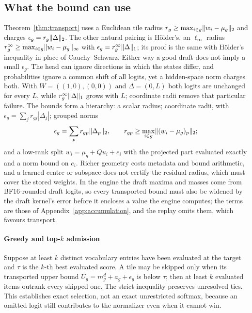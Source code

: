 \subsection{What the bound can use}\label{app:transport-geometry}
Theorem~\ref{thm:transport} uses a Euclidean tile radius $r_g\ge\max_{i\in g}\lVert w_i-\mu_g\rVert_2$ and charges $\epsilon_g=r_g\lVert \Delta\rVert_2$. The other natural pairing is Hölder's, an $\ell_\infty$ radius $r^\infty_g\ge\max_{i\in g}\lVert w_i-\mu_g\rVert_\infty$ with $\epsilon_g=r^\infty_g\lVert \Delta\rVert_1$; its proof is the same with Hölder's inequality in place of Cauchy--Schwarz. Either way a good draft does not imply a small $\epsilon_g$. The head can ignore directions in which the states differ, and probabilities ignore a common shift of all logits, yet a hidden-space norm charges both. With $W=((1,0),(0,0))$ and $\Delta=(0,L)$ both logits are unchanged for every $L$, while $r^\infty_g\lVert \Delta\rVert_1$ grows with $L$; coordinate radii remove that particular failure. The bounds form a hierarchy: a scalar radius; coordinate radii, with $\epsilon_g=\sum_jr_{gj}|\Delta_j|$; grouped norms
\begin{equation}
\epsilon_g=\sum_pr_{gp}\lVert \Delta_p\rVert_2,\qquad r_{gp}\ge\max_{i\in g}\lVert (w_i-\mu_g)_p\rVert_2;\label{eq:groupbound}
\end{equation}
and a low-rank split $w_i=\mu_g+Qu_i+e_i$ with the projected part evaluated exactly and a norm bound on $e_i$. Richer geometry costs metadata and bound arithmetic, and a learned centre or subspace does not certify the residual radius, which must cover the stored weights. In the engine the draft maxima and masses come from BF16-rounded draft logits, so every transported bound must also be widened by the draft kernel's error before it encloses a value the engine computes; the terms are those of Appendix~\ref{app:accumulation}, and the replay omits them, which favours transport.

\paragraph{Greedy and top-$k$ admission} Suppose at least $k$ distinct vocabulary entries have been evaluated at the target and $\tau$ is the $k$-th best evaluated score. A tile may be skipped only when its transported upper bound $U_g=m^d_g+a_g+\epsilon_g$ is below $\tau$; then at least $k$ evaluated items outrank every skipped one. The strict inequality preserves unresolved ties. This establishes exact selection, not an exact unrestricted softmax, because an omitted logit still contributes to the normalizer even when it cannot win.

